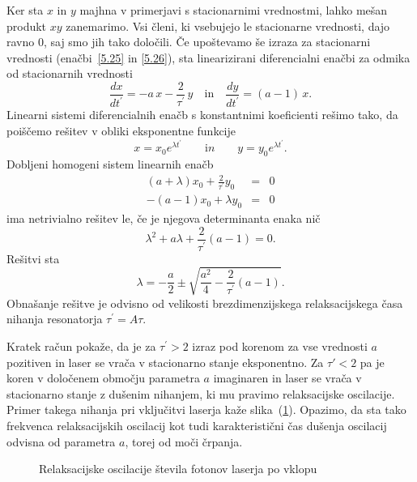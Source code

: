 Ker sta $x$ in $y$ majhna v primerjavi s stacionarnimi vrednostmi, lahko
mešan produkt $xy$ zanemarimo. Vsi členi, ki vsebujejo le stacionarne vrednosti,
dajo ravno 0, saj smo jih tako določili. Če upoštevamo še izraza 
za stacionarni vrednosti (enačbi~\ref {5.25} in \ref{5.26}), 
sta linearizirani diferencialni enačbi za odmika od stacionarnih vrednosti 
\begin{equation}
\frac{dx}{dt^{\prime }} =-a\,x-\frac{2}{\tau ^{\prime }}\,y   \quad \mathrm{in} \quad
\frac{dy}{dt^{\prime }} =(a-1)\,x.
\label{5.28}
\end{equation}
Linearni sistemi diferencialnih enačb s konstantnimi
koeficienti rešimo tako, da poiščemo rešitev v obliki eksponentne funkcije 
\begin{equation}
x=x_{0}e^{\lambda t^{\prime }} \qquad {\mathrm in } \qquad 
y=y_{0}e^{\lambda t^{\prime }}.
\label{5.29}
\end{equation}
Dobljeni homogeni sistem linearnih enačb 
\begin{eqnarray}
(a+\lambda )x_{0}+\frac{2}{\tau ^{\prime }}y_{0} &=&0  \label{5.30} \\
-(a-1)x_{0}+\lambda y_{0} &=&0
\end{eqnarray}
ima netrivialno rešitev le, če je njegova determinanta enaka nič
\begin{equation}
\lambda ^{2}+a\lambda +\frac{2}{\tau ^{\prime }}(a-1)=0.  
\label{5.301}
\end{equation}
Rešitvi sta 
\begin{equation}
\lambda =-\frac{a}{2}\pm \sqrt{\frac{a^{2}}{4}-\frac{2}{\tau ^{\prime }}(a-1)}.
\label{5.31}
\end{equation}
Obnašanje rešitve je odvisno od velikosti brezdimenzijskega relaksacijskega
časa nihanja resonatorja $\tau ^{\prime }=A\tau $. 

Kratek račun pokaže, da je 
za $\tau ^{\prime }>2$ izraz pod korenom za vse vrednosti $a$ pozitiven in laser 
se vrača v stacionarno stanje eksponentno. Za $\tau' <2$ pa je koren v določenem območju
parametra $a$ imaginaren in laser se vrača v stacionarno stanje z
dušenim nihanjem, ki mu pravimo relaksacijske oscilacije. 
Primer takega nihanja 
pri vključitvi laserja kaže slika~(\ref{fig:relax}). Opazimo, da sta tako 
frekvenca relaksacijskih oscilacij kot tudi karakteristični čas dušenja oscilacij
odvisna od parametra $a$, torej od moči črpanja.
\begin{figure}[h]
\centering
\def\svgwidth{90truemm} 

\caption{Relaksacijske oscilacije števila fotonov laserja po vklopu}
\label{fig:relax}
\end{figure}

